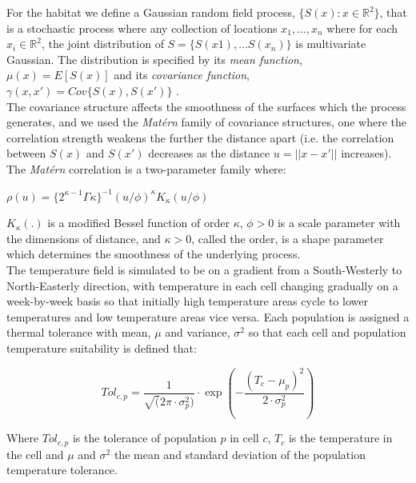 \documentclass[review]{elsarticle}
\begin{document}
For the habitat we define a Gaussian random field process, $\{S(x) : x \in
\mathbb{R}^2\}$, that is a stochastic process where any collection of locations
$x_{1}, \dots, x_{n}$ where for each $x_{i} \in \mathbb{R}^2$, the joint
distribution of $S = \{S(x1),\dots S(x_{n})\}$ is multivariate Gaussian. The
distribution is specified by its \textit{mean function}, $\mu(x) = E[S(x)]$ and
its \textit{covariance function}, $\gamma(x,x') = Cov\{S(x),S(x')\}$
\cite{Diggle2007}.\\

The covariance structure affects the smoothness of the surfaces which the
process generates, and we used the \textit{Matérn} family of covariance
structures, one where the correlation strength weakens the further the distance
apart (i.e. the correlation between $S(x)$ and $S(x')$ decreases as the
distance $u = ||x - x'||$ increases).  The \textit{Matérn} correlation is a
two-parameter family where: \\

\begin{center}
	$\rho(u) = \{2^{\kappa -
		1}\Gamma{\kappa}\}^{-1}(u/\phi)^{\kappa}K_{\kappa}(u/\phi)$
\end{center}
	
$K_{\kappa}(.)$ is a modified Bessel function of order $\kappa$, $\phi >
0$ is a scale parameter with the dimensions of distance, and $\kappa > 0$,
called the order, is a shape parameter which determines the smoothness of the
underlying process. \\

The temperature field is simulated to be on a gradient from a South-Westerly to
North-Easterly direction, with temperature in each cell changing gradually on a
week-by-week basis so that initially high temperature areas cycle to lower
temperatures and low temperature areas vice versa. Each population is assigned
a thermal tolerance with mean, $\mu$ and variance, $\sigma^2$ so that each cell
and population temperature suitability is defined that:

\begin{equation}
	Tol_{c, p} = \frac{1}{ \sqrt (2\pi \cdot \sigma^2_{p})} \cdot \exp(-
		\frac{(T_{c} -
		\mu_{p})^2}{2 \cdot \sigma^2_{p}} )	
\end{equation}

Where $Tol_{c,p}$ is the tolerance of population $p$ in cell $c$, $T_{c}$ is
the temperature in the cell and $\mu$ and $\sigma^2$ the mean and standard
deviation of the population temperature tolerance. \\
\end{document}

